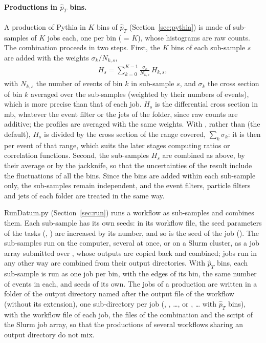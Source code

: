 \paragraph{Productions in $\hat{p}_T$ bins.}
A production of Pythia in $K$ bins of $\hat{p}_T$ (Section~\ref{sec:pythia}) is made of sub-samples of $K$ jobs each,
one per bin ( = $K$), whose histograms are raw counts. The combination proceeds in two steps. First,
the $K$ bins of each sub-sample $s$ are added with the weights $\sigma_k/N_{k,s}$,
\begin{align}
  H_s = \sum_{k=0}^{K-1} \frac{\sigma_k}{N_{k,s}}\, H_{k,s},
\end{align}
with $N_{k,s}$ the number of events of bin $k$ in sub-sample $s$, and $\sigma_k$ the cross section of bin $k$ averaged
over the sub-samples (weighted by their numbers of events), which is more precise than that of each job. $H_s$ is the
differential cross section in mb, whatever the event filter or the jets of the folder, since raw counts are additive;
the profiles are averaged with the same weights. With  , rather than
 (the default), $H_s$ is divided by the cross section of the range covered, $\sum_k\sigma_k$: it is then
per event of that range, which suits the later stages computing ratios or correlation functions. Second, the
sub-samples $H_s$ are combined as above, by their average or by the jackknife, so that the uncertainties of the result
include the fluctuations of all the bins. Since the bins are added within each sub-sample only, the sub-samples remain
independent, and the event filters, particle filters and jets of each folder are treated in the same way.

RunDatum.py (Section~\ref{sec:run}) runs a workflow as sub-samples and combines them. Each sub-sample has its own seeds:
in its workflow file, the seed parameters of the tasks (, ) are increased by its number, and
so is the seed of the job (). The sub-samples run on the computer, several at once, or on a Slurm
cluster, as a job array submitted over , whose outputs are copied back and combined; jobs run in any other way
are combined from their output directories. With $\hat{p}_T$ bins, each sub-sample is run as one job per bin, with the
edges of its bin, the same number of events in each, and seeds of its own. The jobs of a production are written in a
folder of the output directory named after the output file of the workflow (without its extension), one sub-directory
per job (, , \dots, or , \dots{} with $\hat{p}_T$ bins),
with the workflow file of each job, the files of the combination and the script of the Slurm job array, so that the
productions of several workflows sharing an output directory do not mix.
